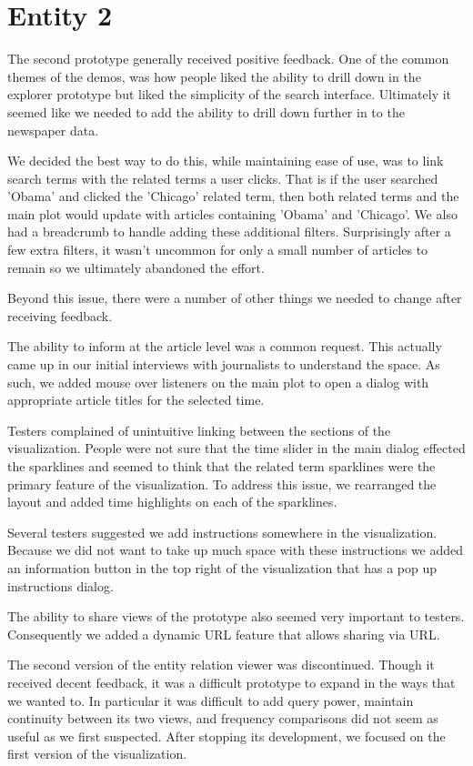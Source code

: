 \section{Entity 2}
The second prototype generally received positive feedback. One of the common themes of the demos, was how people liked the ability to drill down in the explorer prototype but liked the simplicity of the search interface. Ultimately it seemed like we needed to add the ability to drill down further in to the newspaper data.

We decided the best way to do this, while maintaining ease of use, was to link search terms with the related terms a user clicks. That is if the user searched 'Obama' and clicked the 'Chicago' related term, then both related terms and the main plot would update with articles containing 'Obama' and 'Chicago'. We also had a breadcrumb to handle adding these additional filters. Surprisingly after a few extra filters, it wasn't uncommon for only a small number of articles to remain so we ultimately abandoned the effort.

Beyond this issue, there were a number of other things we needed to change after receiving feedback.

The ability to inform at the article level was a common request. This actually came up in our initial interviews with journalists to understand the space. As such, we added mouse over listeners on the main plot to open a dialog with appropriate article titles for the selected time.

Testers complained of unintuitive linking between the sections of the visualization. People were not sure that the time slider in the main dialog effected the sparklines and seemed to think that the related term sparklines were the primary feature of the visualization. To address this issue, we rearranged the layout and added time highlights on each of the sparklines.

Several testers suggested we add instructions somewhere in the visualization. Because we did not want to take up much space with these instructions we added an information button in the top right of the visualization that has a pop up instructions dialog.

The ability to share views of the prototype also seemed very important to testers. Consequently we added a dynamic URL feature that allows sharing via URL.

The second version of the entity relation viewer was discontinued. Though it received decent feedback, it was a difficult prototype to expand in the ways that we wanted to. In particular it was difficult to add query power, maintain continuity between its two views, and frequency comparisons did not seem as useful as we first suspected. After stopping its development, we focused on the first version of the visualization.
